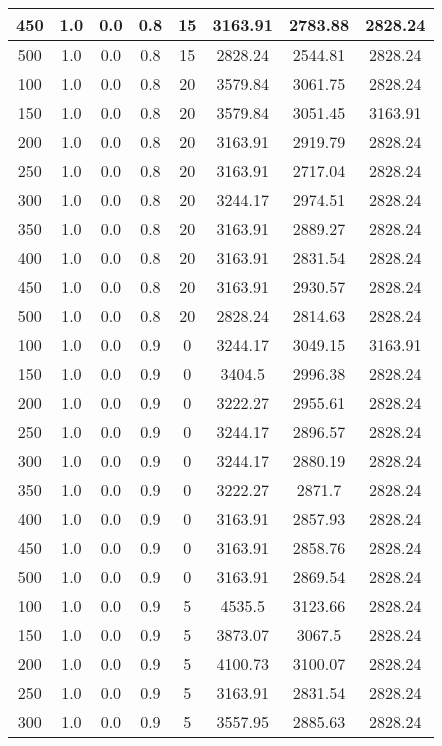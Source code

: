 \documentclass[a4paper, 12pt]{extreport}
\begin{document}
\begin{itemize}
\begin{longtable}{|c|c|c|c|c|c|c|c|}
			450 & 1.0 & 0.0 & 0.8 & 15 & 3163.91 & 2783.88 & 2828.24 \\\hline
			500 & 1.0 & 0.0 & 0.8 & 15 & 2828.24 & 2544.81 & 2828.24 \\\hline
			100 & 1.0 & 0.0 & 0.8 & 20 & 3579.84 & 3061.75 & 2828.24 \\\hline
			150 & 1.0 & 0.0 & 0.8 & 20 & 3579.84 & 3051.45 & 3163.91 \\\hline
			200 & 1.0 & 0.0 & 0.8 & 20 & 3163.91 & 2919.79 & 2828.24 \\\hline
			250 & 1.0 & 0.0 & 0.8 & 20 & 3163.91 & 2717.04 & 2828.24 \\\hline
			300 & 1.0 & 0.0 & 0.8 & 20 & 3244.17 & 2974.51 & 2828.24 \\\hline
			350 & 1.0 & 0.0 & 0.8 & 20 & 3163.91 & 2889.27 & 2828.24 \\\hline
			400 & 1.0 & 0.0 & 0.8 & 20 & 3163.91 & 2831.54 & 2828.24 \\\hline
			450 & 1.0 & 0.0 & 0.8 & 20 & 3163.91 & 2930.57 & 2828.24 \\\hline
			500 & 1.0 & 0.0 & 0.8 & 20 & 2828.24 & 2814.63 & 2828.24 \\\hline
			100 & 1.0 & 0.0 & 0.9 & 0 & 3244.17 & 3049.15 & 3163.91 \\\hline
			150 & 1.0 & 0.0 & 0.9 & 0 & 3404.5 & 2996.38 & 2828.24 \\\hline
			200 & 1.0 & 0.0 & 0.9 & 0 & 3222.27 & 2955.61 & 2828.24 \\\hline
			250 & 1.0 & 0.0 & 0.9 & 0 & 3244.17 & 2896.57 & 2828.24 \\\hline
			300 & 1.0 & 0.0 & 0.9 & 0 & 3244.17 & 2880.19 & 2828.24 \\\hline
			350 & 1.0 & 0.0 & 0.9 & 0 & 3222.27 & 2871.7 & 2828.24 \\\hline
			400 & 1.0 & 0.0 & 0.9 & 0 & 3163.91 & 2857.93 & 2828.24 \\\hline
			450 & 1.0 & 0.0 & 0.9 & 0 & 3163.91 & 2858.76 & 2828.24 \\\hline
			500 & 1.0 & 0.0 & 0.9 & 0 & 3163.91 & 2869.54 & 2828.24 \\\hline
			100 & 1.0 & 0.0 & 0.9 & 5 & 4535.5 & 3123.66 & 2828.24 \\\hline
			150 & 1.0 & 0.0 & 0.9 & 5 & 3873.07 & 3067.5 & 2828.24 \\\hline
			200 & 1.0 & 0.0 & 0.9 & 5 & 4100.73 & 3100.07 & 2828.24 \\\hline
			250 & 1.0 & 0.0 & 0.9 & 5 & 3163.91 & 2831.54 & 2828.24 \\\hline
			300 & 1.0 & 0.0 & 0.9 & 5 & 3557.95 & 2885.63 & 2828.24 \\\hline

\end{longtable}
\end{itemize}
\end{document}
